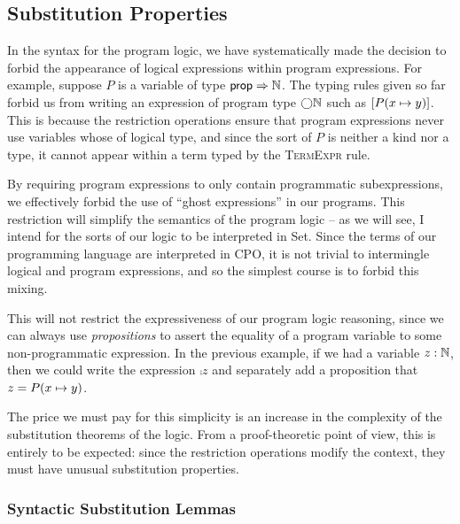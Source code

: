 \subsection{Substitution Properties}

In the syntax for the program logic, we have systematically made the
decision to forbid the appearance of logical expressions within
program expressions. For example, suppose $P$ is a variable of type
$\mathsf{prop} \Rightarrow \mathbb{N}$. The typing rules given so far forbid us from
writing an expression of program type $\bigcirc{\mathbb{N}}$ such as $[P(x
  \mapsto y)]$. This is because the restriction operations ensure
that program expressions never use variables whose of logical type,
and since the sort of $P$ is neither a kind nor a type, it cannot
appear within a term typed by the \textsc{TermExpr} rule.

By requiring program expressions to only contain programmatic
subexpressions, we effectively forbid the use of ``ghost expressions''
in our programs. This restriction will simplify the semantics of the
program logic -- as we will see, I intend for the sorts of our logic
to be interpreted in Set. Since the terms of our programming language
are interpreted in CPO, it is not trivial to intermingle logical and
program expressions, and so the simplest course is to forbid this
mixing.

This will not restrict the expressiveness of our program logic
reasoning, since we can always use \emph{propositions} to assert the
equality of a program variable to some non-programmatic expression. In
the previous example, if we had a variable $z : \mathbb{N}$, then we could
write the expression $\comp{z}$ and separately add a proposition that
$z = P(x \mapsto y)$.

The price we must pay for this simplicity is an increase in the
complexity of the substitution theorems of the logic. From a
proof-theoretic point of view, this is entirely to be expected: since
the restriction operations modify the context, they must have unusual
substitution properties.

\subsubsection{Syntactic Substitution Lemmas}

